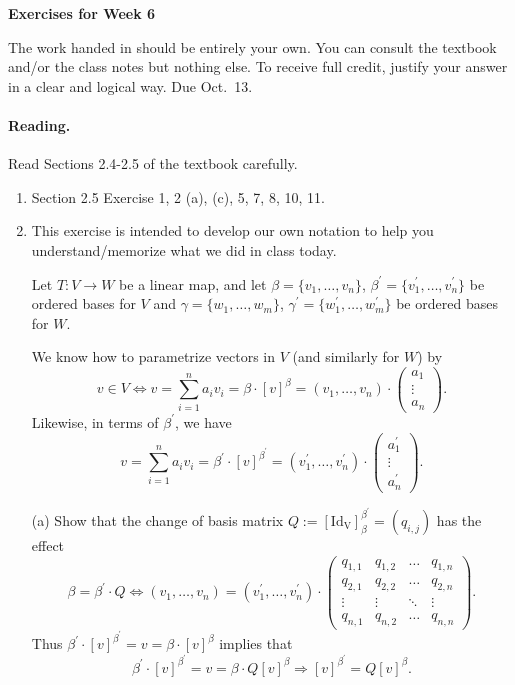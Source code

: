 \documentclass[11pt]{article}
\theoremstyle{plain}
\theoremstyle{definition}
\def\lra{\longrightarrow}
\begin{document}
\begin{center}
{\Large \bf Exercises for Week 6}
\end{center}
The work handed in should be entirely your own. You can consult the textbook and/or the class notes but nothing else. To receive full credit, justify your answer in a clear and logical way. Due Oct.~13.

\paragraph{Reading.} Read Sections 2.4-2.5 of the textbook carefully.

\begin{enumerate}
\item Section 2.5 Exercise 1, 2 (a), (c), 5, 7, 8, 10, 11.
\item This exercise is intended to develop our own notation to help you understand/memorize what we did in class today.

Let $T:V\lra W$ be a linear map, and let $\beta=\{v_1,\dots, v_n\}$, $\beta^\prime=\{v_1^\prime,\dots, v_n^\prime\}$ be ordered bases for $V$ and $\gamma=\{w_1,\dots, w_m\}$, $\gamma^\prime=\{w_1^\prime,\dots, w_m^\prime\}$ be ordered bases for $W$.

We know how to parametrize vectors in $V$ (and similarly for $W$) by
\[
v\in V \Longleftrightarrow v=\sum_{i=1}^n a_iv_i = \beta \cdot [v]^{\beta}= (v_1,\dots, v_n) \cdot
\left( 
\begin{matrix}
a_1\\
\vdots\\
a_n
\end{matrix}
\right).
\]
Likewise, in terms of $\beta^\prime$, we have
\[
 v=\sum_{i=1}^n a_iv_i = \beta^\prime \cdot [v]^{\beta^\prime}= (v_1^\prime,\dots, v_n^\prime) \cdot
\left( 
\begin{matrix}
a_1^\prime\\
\vdots\\
a_n^\prime
\end{matrix}
\right).
\]

(a) Show that the change of basis matrix $Q:= [\mathrm{Id_V}]_\beta^{\beta^\prime}=(q_{i,j})$ has the effect
\[
\beta = \beta^\prime\cdot Q \Longleftrightarrow
(v_1,\dots, v_n)= (v_1^\prime,\dots, v_n^\prime) \cdot
\left( 
\begin{matrix}
q_{1,1} & q_{1,2} &\dots & q_{1,n}\\
q_{2,1} & q_{2,2} &\dots & q_{2,n}\\
\vdots & \vdots &\ddots & \vdots\\
q_{n,1} & q_{n,2} &\dots & q_{n,n}
\end{matrix}
\right).
\]
Thus $\beta^\prime \cdot [v]^{\beta^\prime} = v = \beta \cdot [v]^\beta$ implies that
\[
\beta^\prime \cdot [v]^{\beta^\prime} = v = \beta \cdot Q [v]^\beta \Rightarrow   [v]^{\beta^\prime}=  Q [v]^\beta.
\]


\end{enumerate}
\end{document}
